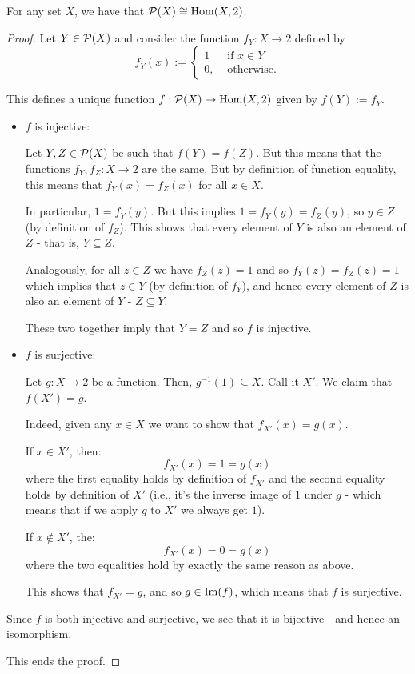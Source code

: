 \begin{lemma}
	For any set $X$, we have that $\mathcal P(X)\cong \mathrm{Hom}(X,2)$.
\end{lemma}
\begin{proof}
	Let $Y\in \mathcal P(X)$ and consider the function $f_Y:X\to 2$ defined by 
	\[f_Y(x):=\begin{cases}
	1&\mbox{ if }x\in Y\\
	0,&\mbox{ otherwise.}
	\end{cases}\]
	
	This defines a unique function $f:\mathcal P(X)\to \mathrm{Hom}(X,2)$ given by $f(Y):=f_Y$.
	
	\begin{itemize}
		\item $f$ is injective:
		
		Let $Y,Z\in \mathcal P(X)$ be such that $f(Y)=f(Z)$. But this means that the functions $f_Y,f_Z:X\to 2$ are the same. But by definition of function equality, this means that $f_Y(x)=f_Z(x)$ for all $x\in X$.
		
		In particular, $1=f_Y(y)$. But this implies $1=f_Y(y)=f_Z(y)$, so $y\in Z$ (by definition of $f_Z$). This shows that every element of $Y$ is also an element of $Z$ - that is, $Y\subseteq Z$.
		
		Analogously, for all $z\in Z$ we have $f_Z(z)=1$ and so $f_Y(z)=f_Z(z)=1$ which implies that $z\in Y$ (by definition of $f_Y$), and hence every element of $Z$ is also an element of $Y$ - $Z\subseteq Y$.
		
		These two together imply that $Y=Z$ and so $f$ is injective.
		
		\item $f$ is surjective:
		
		Let $g:X\to 2$ be a function. Then, $g^{-1}(1)\subseteq X$. Call it $X'$. We claim that $f(X')=g$.
		
		Indeed, given any $x\in X$ we want to show that $f_{X'}(x)=g(x)$.
		
		If $x\in X'$, then:
		\[f_{X'}(x)=1=g(x)\]where the first equality holds by definition of $f_{X'}$ and the second equality holds by definition of $X'$ (i.e., it's the inverse image of $1$ under $g$ - which means that if we apply $g$ to $X'$ we always get $1$).
		
		If $x\notin X'$, the:
		\[f_{X'}(x)=0=g(x)\]where the two equalities hold by exactly the same reason as above.
		
		This shows that $f_{X'}=g$, and so $g\in \operatorname{Im}(f)$, which means that $f$ is surjective.
	\end{itemize}

Since $f$ is both injective and surjective, we see that it is bijective - and hence an isomorphism.

This ends the proof.
\end{proof}


